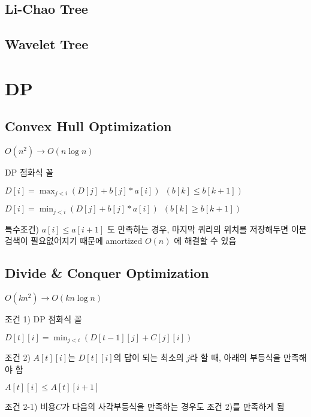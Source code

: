 \documentclass[9pt,landscape,a4paper,twocolumn]{extarticle}
\begin{document}
\subsection{Li-Chao Tree}


\subsection{Wavelet Tree}


\section{DP}
% 

\subsection{Convex Hull Optimization}
$O(n^{2}) \to O(n\log{n})$

DP 점화식 꼴

$D[i] = \max_{j<i}( D[j] + b[j] * a[i] ) \phantom{1} (b[k] \leq b[k+1])$

$D[i] = \min_{j<i}( D[j] + b[j] * a[i] ) \phantom{1} (b[k] \geq b[k+1])$

특수조건) $a[i] \leq a[i+1]$ 도 만족하는 경우, 마지막 쿼리의 위치를 저장해두면 이분검색이 필요없어지기 때문에 amortized $O(n)$ 에 해결할 수 있음



\subsection{Divide \& Conquer Optimization}

$O(kn^{2}) \to O(kn\log{n})$

조건 1) DP 점화식 꼴

$D[t][i] = \min_{j<i}( D[t-1][j] + C[j][i] )$

조건 2) $A[t][i]$는 $D[t][i]$의 답이 되는 최소의 $j$라 할 때, 아래의 부등식을 만족해야 함

$A[t][i] \leq A[t][i+1]$

조건 2-1) 비용$C$가 다음의 사각부등식을 만족하는 경우도 조건 2)를 만족하게 됨
\end{document}
